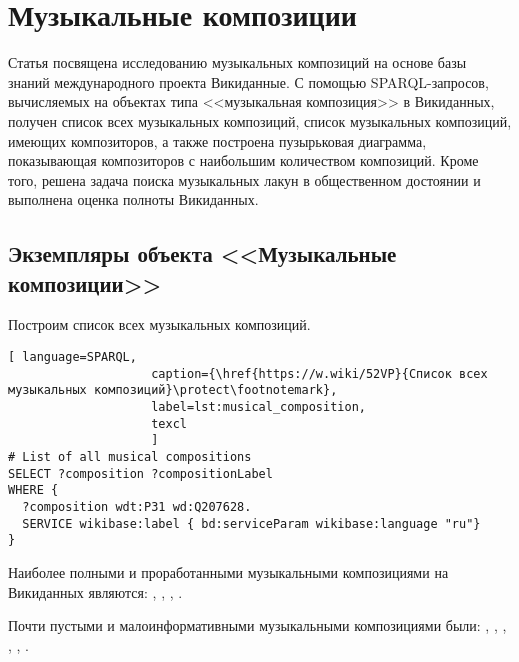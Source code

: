 \chapter{Музыкальные композиции}
\label{ch:musical-composition}
Статья посвящена исследованию музыкальных композиций на основе базы знаний международного проекта Викиданные. С помощью SPARQL-запросов, вычисляемых на объектах типа <<музыкальная композиция>> в Викиданных, получен список всех музыкальных композиций, список музыкальных композиций, имеющих композиторов, а также построена пузырьковая диаграмма, показывающая композиторов с наибольшим количеством композиций. Кроме того, решена задача поиска музыкальных лакун в общественном достоянии и выполнена оценка полноты Викиданных.

\section{Экземпляры объекта <<Музыкальные композиции>>}


Построим список всех музыкальных композиций.

\begin{lstlisting}[ language=SPARQL,
                    caption={\href{https://w.wiki/52VP}{Список всех  музыкальных композиций}\protect\footnotemark},
                    label=lst:musical_composition,
                    texcl 
                    ]
# List of all musical compositions
SELECT ?composition ?compositionLabel 
WHERE {
  ?composition wdt:P31 wd:Q207628.
  SERVICE wikibase:label { bd:serviceParam wikibase:language "ru"}
}
\end{lstlisting}%

Наиболее полными и проработанными музыкальными композициями на Викиданных являются: , , , .

Почти пустыми и малоинформативными музыкальными композициями были: , , , , , .


